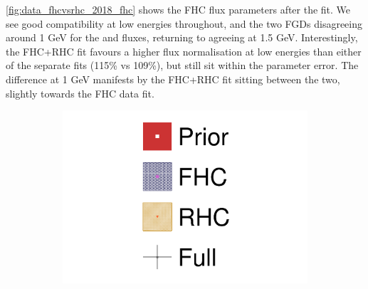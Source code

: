 \autoref{fig:data_fhcvsrhc_2018_fhc} shows the FHC flux parameters after the fit. We see good compatibility at low energies throughout, and the two FGDs disagreeing around 1 GeV for the \numu and \nue fluxes, returning to agreeing at 1.5 GeV. Interestingly, the FHC+RHC fit favours a higher flux normalisation at low energies than either of the separate fits (115\% vs 109\%), but still sit within the parameter error. The difference at 1 GeV manifests by the FHC+RHC fit sitting between the two, slightly towards the FHC data fit.
\begin{figure}[h]
	\centering
	\begin{subfigure}[t]{0.10\textwidth}
		\includegraphics[width=\textwidth,page=1, trim={0mm 0mm 0mm 9mm}, clip]{figures/mach3/2018/data/2018a_FixedCov_RedCov_Mpi_NeuOnly_Data_merge_2018a_FixedCov_RedCov_Mpi_NeuBarOnly_Data_merge_2018a_FixedCov_RedCov_Mpi_Data_merge}
	\end{subfigure}
	

\end{figure}
